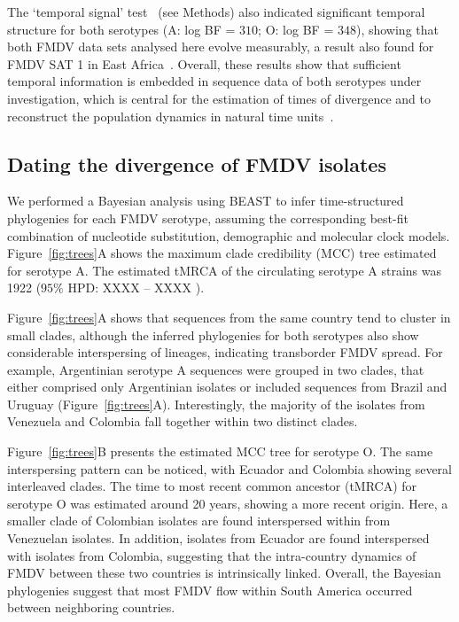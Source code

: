 \documentclass[10pt]{article}
\begin{document}
The `temporal signal' test~\cite{Faria2012} (see Methods) also indicated significant temporal structure for both serotypes (A: log BF = $310$; O: log BF = $348$), showing that both FMDV data sets analysed here evolve measurably, a result also found for FMDV SAT 1 in East Africa~\cite{sangula}.
Overall, these results show that sufficient temporal information is embedded in sequence data of both serotypes under investigation, which is central for the estimation of times of divergence and to reconstruct the population dynamics in natural time units~\cite{MEP}.

\subsection*{Dating the divergence of FMDV isolates}

We performed a Bayesian analysis using BEAST to infer time-structured phylogenies for each FMDV serotype, assuming the corresponding best-fit combination of nucleotide substitution, demographic and molecular clock models.
Figure~\ref{fig:trees}A shows the maximum clade credibility (MCC) tree estimated for serotype A.
The estimated tMRCA of the circulating serotype A strains was 1922 ($95\%$ HPD: XXXX -- XXXX ).

Figure~\ref{fig:trees}A shows that sequences from the same country tend to cluster in small clades, although the inferred phylogenies for both serotypes also show considerable interspersing of lineages, indicating transborder FMDV spread.
For example, Argentinian serotype A sequences were grouped in two clades, that either comprised only Argentinian isolates or included sequences from Brazil and Uruguay (Figure~\ref{fig:trees}A).
Interestingly, the majority of the isolates from Venezuela and Colombia fall together within two distinct clades. 

Figure~\ref{fig:trees}B presents the estimated MCC tree for serotype O.
The same interspersing pattern can be noticed, with Ecuador and Colombia showing several interleaved clades.
The time to most recent common ancestor (tMRCA) for serotype O was estimated around 20 years, showing a more recent origin.
Here, a smaller clade of Colombian isolates are found interspersed within from Venezuelan isolates.
In addition, isolates from Ecuador are found interspersed with isolates from Colombia, suggesting that the intra-country dynamics of FMDV between these two countries is intrinsically linked.
Overall, the Bayesian phylogenies suggest that most FMDV flow within South America occurred between neighboring countries. 
\end{document}
